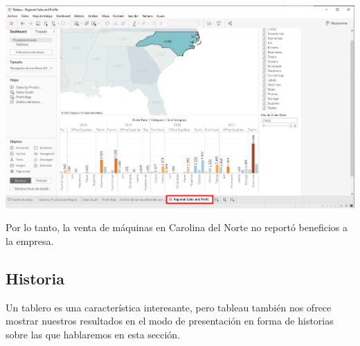 \documentclass[12pt,letterpaper]{article}
\begin{document}
\begin{enumerate}
\begin{center}
            \includegraphics[width=15cm]{./img/img86.png}
        \end{center}
    \end{enumerate}
    Por lo tanto, la venta de máquinas en Carolina del Norte no reportó beneficios a la empresa.
    \subsection{Historia}
    Un tablero es una característica interesante, pero tableau también nos ofrece mostrar nuestros resultados en el modo de presentación en forma de historias sobre las que hablaremos en esta sección.
\end{document}
